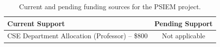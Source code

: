 \begin{table}[!htbp]
    \centering
    \begin{tabular}{|l|c|}
        \hline
        \textbf{Current Support} & \textbf{Pending Support} \\
        \hline
        CSE Department Allocation (Professor) -- \$800 & Not applicable \\
        \hline
    \end{tabular}
    \caption{Current and pending funding sources for the PSIEM project.}
    \label{tab:support}
\end{table}
